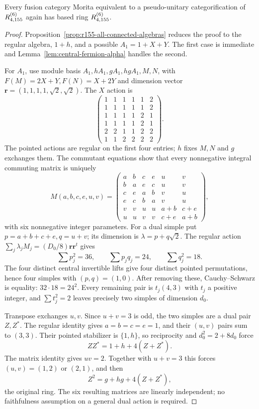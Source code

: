 \begin{theorem}\label{thm:r155-morita-ring-rigidity}
Every fusion category Morita equivalent to a pseudo-unitary
categorification of $R^{(6)}_{4,155}$ again has based ring $R^{(6)}_{4,155}$.
\end{theorem}
\begin{proof}
Proposition~\ref{prop:r155-all-connected-algebras} reduces the proof to
the regular algebra, $1+h$, and a possible $A_1=1+X+Y$.
The first case is immediate and Lemma~\ref{lem:central-fermion-alpha}
handles the second.

For $A_1$, use module basis $A_1,hA_1,gA_1,hgA_1,M,N$, with
$F(M)=2X+Y,F(N)=X+2Y$ and dimension vector
$\mathbf r=(1,1,1,1,\sqrt2,\sqrt2)$. The $X$ action is
\[
\begin{pmatrix}
1&1&1&1&1&2\\1&1&1&1&1&2\\1&1&1&1&2&1\\
1&1&1&1&2&1\\2&2&1&1&2&2\\1&1&2&2&2&2
\end{pmatrix}.
\]
The pointed actions are regular on the first four entries; $h$ fixes
$M,N$ and $g$ exchanges them. The commutant equations show that every
nonnegative integral commuting matrix is uniquely
\[
 M(a,b,c,e,u,v)=
\begin{pmatrix}
a&b&c&e&u&v\\b&a&e&c&u&v\\c&e&a&b&v&u\\e&c&b&a&v&u\\
v&v&u&u&a+b&c+e\\u&u&v&v&c+e&a+b
\end{pmatrix},
\]
with six nonnegative integer parameters. For a dual simple put
$p=a+b+c+e,q=u+v$; its dimension is $\lambda=p+q\sqrt2$.
The regular action $\sum_j\lambda_j M_j=(D_0/8)\mathbf r\mathbf r^t$ gives
\[
 \sum p_j^2=36,\qquad \sum p_jq_j=24,\qquad\sum q_j^2=18.
\]
The four distinct central invertible lifts give four distinct pointed
permutations, hence four simples with $(p,q)=(1,0)$.
After removing these, Cauchy--Schwarz is equality:
$32\cdot18=24^2$. Every remaining pair is $t_j(4,3)$ with $t_j$
a positive integer, and $\sum t_j^2=2$ leaves precisely two simples
of dimension $d_0$.

Transpose exchanges $u,v$. Since $u+v=3$ is odd, the two simples are
a dual pair $Z,Z^*$. The regular identity gives $a=b=c=e=1$, and
their $(u,v)$ pairs sum to $(3,3)$. Their pointed stabilizer is
$\{1,h\}$, so reciprocity and $d_0^2=2+8d_0$ force
\[
 ZZ^*=1+h+4(Z+Z^*).
\]
The matrix identity gives $uv=2$. Together with $u+v=3$ this forces
$(u,v)=(1,2)$ or $(2,1)$, and then
\[
 Z^2=g+hg+4(Z+Z^*),
\]
the original ring. The six resulting matrices are linearly independent;
no faithfulness assumption on a general dual action is required.
\end{proof}

